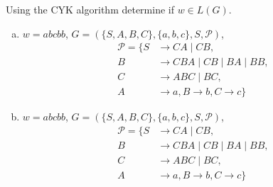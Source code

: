 \documentclass[a4paper,12pt]{amsart}
\begin{document}
\medskip\begin{problem}
    
    Using the CYK algorithm determine if $w\in L(G)$.

    \begin{enumerate}[(a)]\setlength{\itemsep}{3pt}

        \item $w=abcbb$, $G=(\{S,A,B,C\},\{a,b,c\},S,\mathcal P)$, 
        \begin{align*}
            \mathcal P=\{S&\rightarrow CA\mid CB, \\
            B&\rightarrow CBA\mid CB\mid BA\mid BB, \\
            C&\rightarrow ABC\mid BC,\\
            A&\rightarrow a, B\rightarrow b, C\rightarrow c\}
        \end{align*}
    
        \item $w=abcbb$, $G=(\{S,A,B,C\},\{a,b,c\},S,\mathcal P)$,
        \begin{align*}
            \mathcal P=\{S&\rightarrow CA\mid CB, \\
            B&\rightarrow CBA\mid CB\mid BA\mid BB, \\
            C&\rightarrow ABC\mid BC,\\
            A&\rightarrow a, B\rightarrow b, C\rightarrow c\}
        \end{align*}

    \end{enumerate}

\end{problem}
\end{document}
